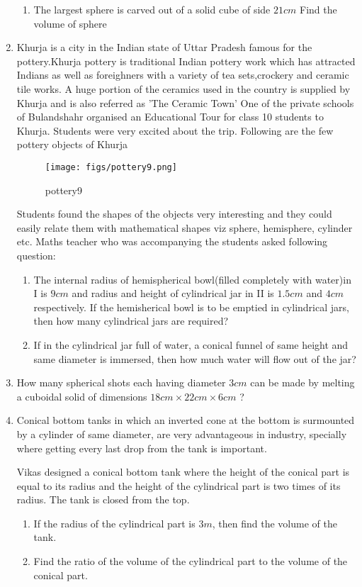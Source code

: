 \documentclass{article}
\begin{document}
\begin{enumerate}
\begin{enumerate}
    \item The largest sphere is carved out of a solid cube of side $21cm$ Find the volume of sphere
\end{enumerate}
\item Khurja is a city in the Indian state of Uttar Pradesh famous for the pottery.Khurja pottery is traditional Indian pottery work which has attracted Indians as well as foreighners with a variety of tea sets,crockery and ceramic tile works. A huge portion of the ceramics used in the country is supplied by Khurja and is also referred as 'The Ceramic Town'
One of the private schools of Bulandshahr organised an Educational Tour for class 10 students to Khurja. Students were very excited about the trip. Following are the few pottery objects of Khurja
\begin{figure}[H]
    \centering
    \texttt{[image: figs/pottery9.png]}
    \caption{pottery9}
    \label{fig:pottery9}
\end{figure}
Students found the shapes of the objects very interesting and they could easily relate them with mathematical shapes viz sphere, hemisphere, cylinder etc. Maths teacher who was accompanying the students asked following question:
\begin{enumerate}
    \item The internal radius of hemispherical bowl(filled completely with water)in I is $9cm$ and radius and height of cylindrical jar in II is $1.5cm$ and $4cm$ respectively. If the hemisherical bowl is to be emptied in cylindrical jars, then how many cylindrical jars are required?
    \item If in the cylindrical jar full of water, a conical funnel of same height and same diameter is immersed, then how much water will flow out of the jar?
\end{enumerate}
\newpage
\item How many spherical shots each having diameter $3 cm$ can be made by melting a cuboidal solid of dimensions $18 cm\times 22 cm\times 6 cm$ ?
\item Conical bottom tanks in which an inverted cone at the bottom is surmounted by a cylinder of same diameter, are very advantageous in industry, specially where getting every last drop from the tank is important.

Vikas designed a conical bottom tank where the height of the conical part is equal to its radius and the height of the cylindrical part is two times of its radius. The tank is closed from the top.
\begin{enumerate}
    \item If the radius of the cylindrical part is $3 m$, then find the volume of the tank.
    \item Find the ratio of the volume of the cylindrical part to the volume of the conical part.
\end{enumerate}
              


\end{enumerate}
\end{document}
